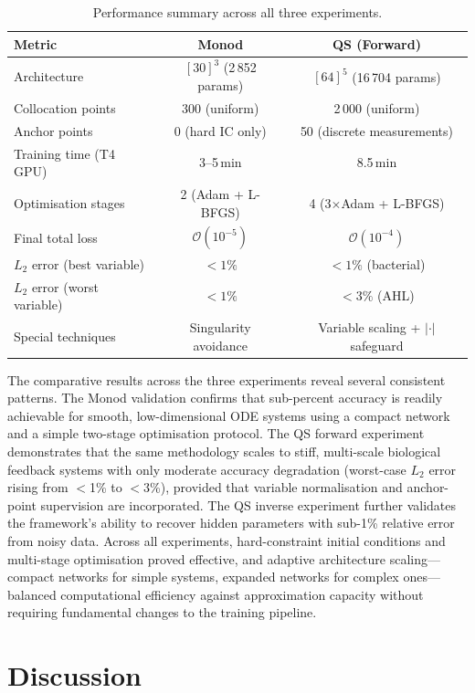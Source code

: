 \documentclass[14pt,a4paper,openany]{extbook}
\begin{document}
\begin{table}[hbt]
\centering
\caption{Performance summary across all three experiments.}
\label{tab:comparison}
\begin{tabular}{lcc}
\hline
\textbf{Metric} & \textbf{Monod} & \textbf{QS (Forward)} \\ \hline
Architecture & $[30]^3$ (2\,852 params) & $[64]^5$ (16\,704 params) \\
Collocation points & 300 (uniform) & 2\,000 (uniform) \\
Anchor points & 0 (hard IC only) & 50 (discrete measurements) \\
Training time (T4 GPU) & 3--5\,min & 8.5\,min \\
Optimisation stages & 2 (Adam + L-BFGS) & 4 (3$\times$Adam + L-BFGS) \\
Final total loss & $\mathcal{O}(10^{-5})$ & $\mathcal{O}(10^{-4})$ \\
$L_2$ error (best variable) & $<1\%$ & $<1\%$ (bacterial) \\
$L_2$ error (worst variable) & $<1\%$ & $<3\%$ (AHL) \\
Special techniques & Singularity avoidance & Variable scaling + $|\cdot|$ safeguard \\ \hline
\end{tabular}
\end{table}

The comparative results across the three experiments reveal several consistent patterns. The Monod validation confirms that sub-percent accuracy is readily achievable for smooth, low-dimensional ODE systems using a compact network and a simple two-stage optimisation protocol. The QS forward experiment demonstrates that the same methodology scales to stiff, multi-scale biological feedback systems with only moderate accuracy degradation (worst-case $L_2$ error rising from $<$1\% to $<$3\%), provided that variable normalisation and anchor-point supervision are incorporated. The QS inverse experiment further validates the framework's ability to recover hidden parameters with sub-1\% relative error from noisy data. Across all experiments, hard-constraint initial conditions and multi-stage optimisation proved effective, and adaptive architecture scaling---compact networks for simple systems, expanded networks for complex ones---balanced computational efficiency against approximation capacity without requiring fundamental changes to the training pipeline.

\section{Discussion}
\label{sec:discussion}
\end{document}
